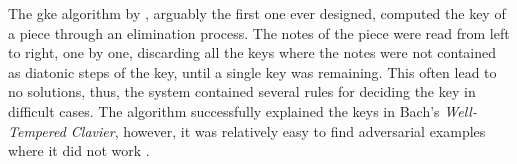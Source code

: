 


The \gls{gke} algorithm by
\textcite{longuethiggins1971interpreting}, arguably the
first one ever designed, computed the key of a piece through
an elimination process. The notes of the piece were read
from left to right, one by one, discarding all the keys
where the notes were not contained as diatonic steps of the
key, until a single key was remaining. This often lead to no
solutions, thus, the system contained several rules for
deciding the key in difficult cases. The algorithm
successfully explained the keys in Bach's
\emph{Well-Tempered Clavier}, however, it was relatively
easy to find adversarial examples where it did not work
\parencite{temperley2008pitchclass}.


